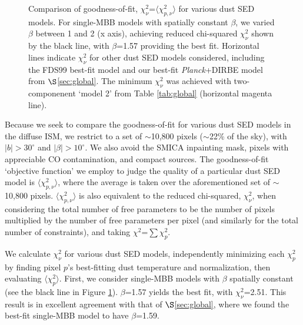 \documentclass{emulateapj}
\newcommand{\PLANCK}{{\it Planck}}
\begin{document}
\begin{figure}
\begin{center}
\caption{\label{fig:chi2_dirbe} Comparison of goodness-of-fit, 
$\chi^2_{\nu}$=$\langle \chi^2_{p, \nu} \rangle$ for various dust SED models. 
For single-MBB models with spatially constant $\beta$, we varied $\beta$ 
between 1 and 2 (x axis), achieving reduced chi-squared $\chi^2_{\nu}$ shown by
the black line, with $\beta$=1.57 providing the best fit. Horizontal lines 
indicate $\chi^2_{\nu}$ for other dust SED models considered, including the 
FDS99 best-fit model and our best-fit \PLANCK+DIRBE model from 
$\S$\ref{sec:global}. The minimum $\chi^2_{\nu}$ was achieved with
two-componenent `model 2' from Table \ref{tab:global} (horizontal magenta 
line).}
\end{center}
\end{figure}

Because we seek to compare the goodness-of-fit for various dust SED models in 
the diffuse ISM, we restrict to a set of $\sim$10,800 pixels ($\sim$22\% of the
sky), with $|b|>30^{\circ}$ and $|\beta|>10^{\circ}$. We also avoid the SMICA 
inpainting mask, pixels with appreciable CO contamination, and compact sources.
The goodness-of-fit `objective function' we employ to judge the quality of 
a particular dust SED model is $\langle \chi^2_{p, \nu} \rangle$, where the 
average is taken over the aforementioned set of $\sim$10,800 pixels. 
$\langle \chi_{p, \nu}^2 \rangle$ is also equivalent to the reduced 
chi-squared, $\chi^2_{\nu}$, when considering the total number of free 
parameters to be the number of pixels multiplied by the number of free 
parameters per pixel (and similarly for the total number of constraints), and
taking $\chi^2$=$\sum\chi^2_{p}$.

We calculate $\chi^2_{\nu}$ for various dust SED models, independently 
minimizing each $\chi^2_p$ by finding pixel $p$'s best-fitting dust 
temperature and normalization, then evaluating $\langle \chi_{p}^2 \rangle$. 
First, we consider single-MBB models with $\beta$ spatially constant (see the
black line in Figure \ref{fig:chi2_dirbe}). $\beta$=1.57 yields the best fit, 
with $\chi^2_{\nu}$=2.51. This result is in excellent agreement with that of 
$\S$\ref{sec:global}, where we found the best-fit single-MBB model to have 
$\beta$=1.59. 
\end{document}
